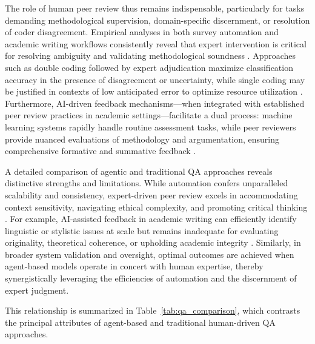 \documentclass[sigconf]{acmart}
\begin{document}
The role of human peer review thus remains indispensable, particularly for tasks demanding methodological supervision, domain-specific discernment, or resolution of coder disagreement. Empirical analyses in both survey automation and academic writing workflows consistently reveal that expert intervention is critical for resolving ambiguity and validating methodological soundness \cite{ref88}\cite{ref89}\cite{ref91}\cite{ref92}\cite{ref96}\cite{ref98}\cite{ref108}. Approaches such as double coding followed by expert adjudication maximize classification accuracy in the presence of disagreement or uncertainty, while single coding may be justified in contexts of low anticipated error to optimize resource utilization \cite{ref89}\cite{ref91}. Furthermore, AI-driven feedback mechanisms—when integrated with established peer review practices in academic settings—facilitate a dual process: machine learning systems rapidly handle routine assessment tasks, while peer reviewers provide nuanced evaluations of methodology and argumentation, ensuring comprehensive formative and summative feedback \cite{ref96}\cite{ref97}\cite{ref98}\cite{ref108}.

A detailed comparison of agentic and traditional QA approaches reveals distinctive strengths and limitations. While automation confers unparalleled scalability and consistency, expert-driven peer review excels in accommodating context sensitivity, navigating ethical complexity, and promoting critical thinking \cite{ref96}\cite{ref97}\cite{ref112}\cite{ref113}\cite{ref114}\cite{ref115}. For example, AI-assisted feedback in academic writing can efficiently identify linguistic or stylistic issues at scale but remains inadequate for evaluating originality, theoretical coherence, or upholding academic integrity \cite{ref96}\cite{ref97}\cite{ref98}. Similarly, in broader system validation and oversight, optimal outcomes are achieved when agent-based models operate in concert with human expertise, thereby synergistically leveraging the efficiencies of automation and the discernment of expert judgment.

This relationship is summarized in Table~\ref{tab:qa_comparison}, which contrasts the principal attributes of agent-based and traditional human-driven QA approaches.
\end{document}
